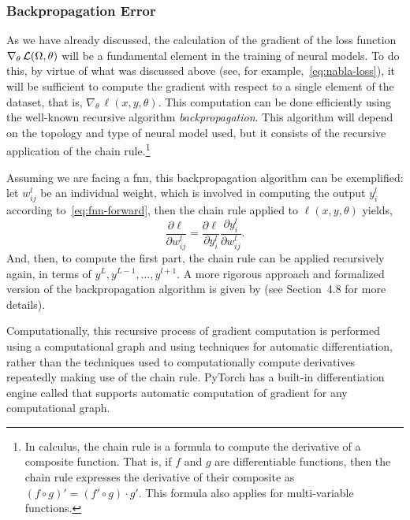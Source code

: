 \subsubsection{Backpropagation Error}

As we have already discussed, the calculation of the gradient of the loss
function \(\nabla _{\theta}\,\mathcal{L} (\Omega, \theta)\) will be a fundamental
element in the training of neural models. To do this, by virtue of what was
discussed above (see, for example,\ \vref{eq:nabla-loss}), it will be
sufficient to compute the gradient with respect to a single element of the
dataset, that is, \(\nabla _{\theta }\,\ell (x, y, \theta)\). This computation
can be done efficiently using the well-known recursive algorithm
\emph{backpropagation}. This algorithm will depend on the topology and type of
neural model used, but it consists of the recursive application of the chain
rule.\footnote{In calculus, the chain rule is a formula to compute the
  derivative of a composite function. That is, if \(f\) and \(g\) are
  differentiable functions, then the chain rule expresses the derivative of
  their composite as \((f\circ g)' = (f'\circ g)\cdot g'\). This formula also
  applies for multi-variable functions.}

Assuming we are facing a \gls{fnn}, this backpropagation algorithm can be
exemplified: let \(w_ {ij} ^ l\) be an individual weight, which is involved in
computing the output \(y_i^l\) according to\ \vref{eq:fnn-forward}, then the
chain rule applied to \(\ell (x, y, \theta)\) yields,
\begin{equation}
  \frac{\partial \ell}{\partial w_{ij}^l} =
  \frac{\partial \ell}{\partial y_i^l}
  \frac{\partial y_i^l}{\partial w_{ij}^l}.
\end{equation}
And, then, to compute the first part, the chain rule can be applied recursively
again, in terms of \(y^L, y^{L - 1}, \ldots, y^{l + 1}\). A more rigorous
approach and formalized version of the backpropagation algorithm is given by
 (see Section~4.8 for more
details).

Computationally, this recursive process of gradient computation is performed
using a computational graph and using techniques for automatic differentiation,
rather than the techniques used to computationally compute derivatives
repeatedly making use of the chain rule. PyTorch has a built-in differentiation
engine called  that supports automatic computation of
gradient for any computational graph.

